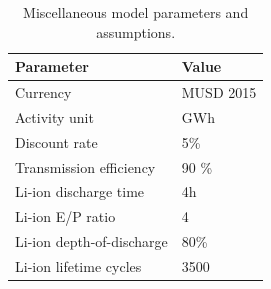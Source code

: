 \begin{table}[!ht]
	\caption{Miscellaneous model parameters and assumptions.}
	\vspace{0.1in}
	\begin{tabularx}{\textwidth}{p{} p{}}
		\hline
\textbf{Parameter} & \textbf{Value} \\
\hline
Currency & MUSD 2015 \\
Activity unit & GWh\\
Discount rate & 5\% \\
Transmission efficiency & 90 \% \\
Li-ion discharge time \cite{mongird_energy_2019} & 4h \\
Li-ion E/P ratio \cite{mongird_energy_2019} & 4  \\
Li-ion depth-of-discharge \cite{mongird_energy_2019} & 80\% \\
Li-ion lifetime cycles \cite{mongird_energy_2019} & 3500  \\
\hline 
	\end{tabularx}
\label{misc-assump}
\end{table}
